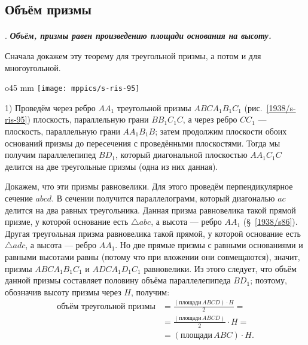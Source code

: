 \subsection*{Объём призмы}

\paragraph{}\label{1938/s88}
.
\textbf{\emph{Объём, призмы равен произведению площади основания на высоту.}}

Сначала докажем эту теорему для треугольной призмы, а потом и для многоугольной.

\begin{wrapfigure}{o}{45 mm}
\vskip-4mm
\centering
\texttt{[image: mppics/s-ris-95]}
\caption{}\label{1938/s-ris-95}
\vskip-0mm
\end{wrapfigure}

{\sloppy

1) Проведём через ребро $AA_1$ треугольной призмы $ABCA_1B_1C_1$ (рис.~\ref{1938/s-ris-95}) плоскость, параллельную грани $BB_1C_1C$, а через ребро $CC_1$ — плоскость, параллельную грани $AA_1B_1B$;
затем продолжим плоскости обоих оснований призмы до пересечения с проведёнными плоскостями.
Тогда мы получим параллелепипед $BD_1$, который диагональной плоскостью $AA_1C_1C$ делится на две треугольные призмы (одна из них данная).

}

Докажем, что эти призмы равновелики.
Для этого проведём перпендикулярное сечение $abcd$.
В сечении получится параллелограмм, который диагональю $ac$ делится на два равных треугольника.
Данная призма равновелика такой прямой призме, у которой основание есть $\triangle abc$, а высота — ребро $AA_1$ (§~\ref{1938/s86}).
Другая треугольная призма равновелика такой прямой, у которой основание есть $\triangle adc$, а высота — ребро $AA_1$.
Но две прямые призмы с равными основаниями и равными высотами равны (потому что при вложении они совмещаются), значит, призмы $ABCA_1B_1C_1$ и $ADCA_1D_1C_1$ равновелики.
Из этого следует, что объём данной призмы составляет половину объёма параллелепипеда $BD_1$;
поэтому, обозначив высоту призмы через $H$, получим:
\begin{align*}
\text{объём треугольной призмы}
&=
\frac{(\text{площади}\,ABCD)\cdot H}2=
\\
&=
\frac{(\text{площади}\,ABCD)}2\cdot H=
\\
&=
(\text{площади}\,ABC)\cdot H.
\end{align*}

